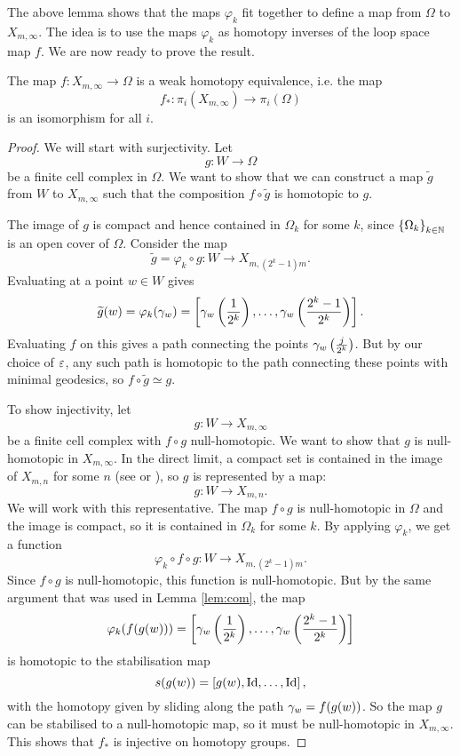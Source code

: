 The above lemma shows that the maps $\varphi_k$ fit together to define
a map from $\Omega$ to $X_{m,\infty}$.
The idea is to use the maps $\varphi_k$ as homotopy inverses of the
loop space map $f$. We are now ready to prove the result.

\begin{theorem}
  The map $f : X_{m,\infty} \to \Omega$ is a weak homotopy
  equivalence, i.e. the map
  \[f_* : \pi_i(X_{m,\infty}) \to \pi_i(\Omega)\]
  is an isomorphism for all $i$.
\end{theorem}


\begin{proof}
  We will start with surjectivity. Let
  \[ g : W \to \Omega \]
  be a finite cell complex in $\Omega$. We want to show that we can
  construct a map $\widetilde g$ from $W$ to $X_{m,\infty}$ such that
  the composition $f\circ \widetilde g$ is homotopic to $g$.
  
  The image of $g$ is compact and hence contained in $\Omega_k$ for
  some $k$, since $\left\{ \Omega_k \right\}_{k\in\mathbb{N}}$ is an open cover of
  $\Omega$. Consider the map 
  \[ \widetilde g = \varphi_k\circ g : W \to X_{m,(2^k-1)m}. \]
  Evaluating at a point $w\in W$ gives
  \[ \widetilde g(w) = \varphi_k(\gamma_w) = \left[
    \gamma_w\left(\frac{1}{2^k}\right),\dots,
    \gamma_w\left(\frac{2^k-1}{2^k}\right) \right]. \]
  Evaluating $f$ on this gives a path connecting the points
  $\gamma_w\left(\frac{j}{2^k}\right)$. But by our choice of $\varepsilon$, any
  such path is homotopic to the path connecting these points with
  minimal geodesics, so $f\circ\widetilde g \simeq g$.

  To show injectivity, let
  \[ g : W \to X_{m,\infty}\]
  be a finite cell complex with $f\circ g$ null-homotopic. We want to
  show that $g$ is null-homotopic in $X_{m,\infty}$. In the
  direct limit, a compact set is contained in the image of $X_{m,n}$
  for some $n$ (see \cite[Proposition~A.1]{hatcher} or
  \cite[Chapter~9.4]{may}), so $g$ is represented by a map:
  \[ g : W \to X_{m,n}. \]
  We will work with this representative. The map $f\circ
  g$ is null-homotopic in $\Omega$ and the image is compact, so it is
  contained in $\Omega_k$ for some $k$. By applying $\varphi_k$, we
  get a function
  \[ \varphi_k\circ f\circ g : W \to X_{m,(2^k-1)m}. \]
  Since $f\circ g$ is null-homotopic, this function is
  null-homotopic. But by the same argument that was used in
  Lemma \ref{lem:com}, the map
  \[ \varphi_k(f(g(w))) = \left[
    \gamma_w\left(\frac{1}{2^k}\right),\dots,\gamma_w\left(\frac{2^k-1}{2^k}
    \right)\right] \] 
  is homotopic to the stabilisation map
  \[ s(g(w)) = \left[g(w),\operatorname{Id},\dots,\operatorname{Id}\right], \]
  with the homotopy given by sliding along the path $\gamma_w=f(g(w))$.
  So the map $g$ can be stabilised to a null-homotopic map, so it must
  be null-homotopic in $X_{m,\infty}$. This shows that $f_*$ is
  injective on homotopy groups.
\end{proof}

